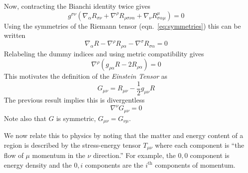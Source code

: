 Now, contracting the Bianchi identity twice gives
%
\begin{equation*}
g^{\sigma\nu}
\left(\nabla_\alpha R_{\sigma\nu}
+ \nabla^\rho R_{\rho\sigma\nu\alpha}
+ \nabla_\nu R^\mu_{\sigma\alpha\mu}\right) = 0
\end{equation*}
%
Using the symmetries of the Riemann tensor (eqn.~\ref{eq:symmetries})
this can be written
%
\begin{equation*}
\nabla_\alpha R
- \nabla^\rho R_{\rho\alpha}
- \nabla^\sigma R_{\sigma\alpha} = 0
\end{equation*}
%
Relabeling the dummy indices and using metric compatibility gives
%
\begin{equation*}
\nabla^\rho \left(g_{\rho\alpha} R - 2 R_{\rho\alpha} \right) = 0
\end{equation*}
%
This motivates the definition of the \emph{Einstein Tensor} as
%
\begin{equation}
\label{eq:einstein_tensor}
G_{\mu\nu} = R_{\mu\nu} - \frac{1}{2} g_{\mu\nu} R
\end{equation}
%
The previous result implies this is divergentless
%
\begin{equation*}
\nabla^\nu G_{\mu\nu} = 0
\end{equation*}
%
Note also that $G$ is symmetric, $G_{\mu\nu} = G_{\nu\mu}$.

We now relate this to physics by noting that the matter and energy
content of a region is described by the stress-energy tensor
$T_{\mu\nu}$ where each component is ``the flow of $\mu$ momentum in the
$\nu$ direction.''  For example, the $0,0$ component is energy density
and the $0,i$ components are the $i^\mathrm{th}$ components of
momentum.

